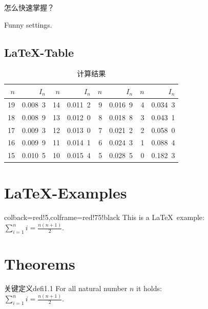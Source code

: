 \begin{tcolorbox}[colback=yellow!10,colframe=red!75!black,title=小窍门]
  怎么快速掌握？
\end{tcolorbox}


\begin{tcolorbox}[colback=blue!50,colframe=blue!25!black,coltext=yellow,
    fontupper=\Large\bfseries,arc=6mm,boxrule=2mm,boxsep=5mm]
  Funny settings.
\end{tcolorbox}

\subsection{\LaTeX-Table}

\begin{table}[h]\begin{center}\color{darkblue}\caption{计算结果}\color{black}\label{tab1-2}
{\footnotesize
\begin{tabular}{r|r||r|r||r|r||r|r}\arrayrulecolor{darkblue}\hline\rowcolor{lightblue}
  $n$&$I_n$&$n$&$I_n$&$n$&$I_n$&$n$&$I_n$\\\hline
  19&0.008\ 3&14&0.011\ 2&9&0.016\ 9&4&0.034\ 3\\
  18&0.008\ 9&13&0.012\ 0&8&0.018\ 8&3&0.043\ 1\\
  17&0.009\ 3&12&0.013\ 0&7&0.021\ 2&2&0.058\ 0\\
  16&0.009\ 9&11&0.014\ 1&6&0.024\ 3&1&0.088\ 4\\
  15&0.010\ 5&10&0.015\ 4&5&0.028\ 5&0&0.182\ 3\\\hline
 \end{tabular}}\end{center}\end{table}


\section{\LaTeX-Examples}

\begin{tcblisting}{colback=red!5,colframe=red!75!black}
This is a \LaTeX\ example:
$\displaystyle\sum\limits_{i=1}^n i = \frac{n(n+1)}{2}$.
\end{tcblisting}


\section{Theorems}

\begin{defi}{关键定义}{defi1.1}
  For all natural number $n$ it holds:\\[2mm]
  $\displaystyle\sum\limits_{i=1}^n i = \frac{n(n+1)}{2}$.
\end{defi}

